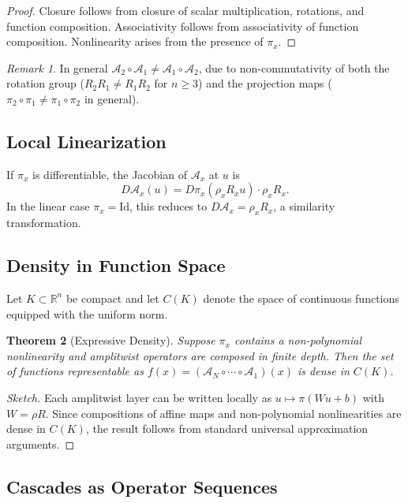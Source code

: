 \documentclass[12pt, a4paper]{article}
\newtheorem{theorem}{Theorem}[section]
\theoremstyle{remark}
\newtheorem{remark}[theorem]{Remark}
\theoremstyle{definition}
\begin{document}
\begin{proof}
Closure follows from closure of scalar multiplication, rotations, and function composition.
Associativity follows from associativity of function composition.  Nonlinearity arises from
the presence of $\pi_x$.
\end{proof}

\begin{remark}
In general $\mathcal{A}_2 \circ \mathcal{A}_1 \neq \mathcal{A}_1 \circ \mathcal{A}_2$,
due to non-commutativity of both the rotation group ($R_2 R_1 \neq R_1 R_2$ for $n \ge 3$)
and the projection maps ($\pi_2 \circ \pi_1 \neq \pi_1 \circ \pi_2$ in general).
\end{remark}

\subsection{Local Linearization}

If $\pi_x$ is differentiable, the Jacobian of $\mathcal{A}_x$ at $u$ is
\[
D\mathcal{A}_x(u) = D\pi_x(\rho_x R_x u)\cdot \rho_x R_x.
\]
In the linear case $\pi_x = \mathrm{Id}$, this reduces to $D\mathcal{A}_x = \rho_x R_x$,
a similarity transformation.

\subsection{Density in Function Space}

Let $K \subset \mathbb{R}^n$ be compact and let $C(K)$ denote the space of continuous
functions equipped with the uniform norm.

\begin{theorem}[Expressive Density]
\label{thm:density}
Suppose $\pi_x$ contains a non-polynomial nonlinearity and amplitwist operators are
composed in finite depth.  Then the set of functions representable as
$f(x) = (\mathcal{A}_N \circ \cdots \circ \mathcal{A}_1)(x)$
is dense in $C(K)$.
\end{theorem}

\begin{proof}[Sketch]
Each amplitwist layer can be written locally as $u \mapsto \pi(Wu + b)$ with $W = \rho R$.
Since compositions of affine maps and non-polynomial nonlinearities are dense in $C(K)$,
the result follows from standard universal approximation arguments.
\end{proof}

\subsection{Cascades as Operator Sequences}
\end{document}
